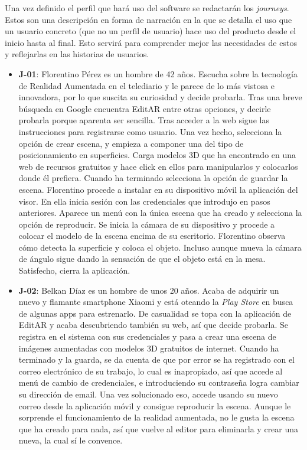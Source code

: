 Una vez definido el perfil que hará uso del software se redactarán los \textit{journeys}. Estos son una descripción en forma de narración en la que se detalla el uso que un usuario concreto (que no un perfil de usuario) hace uso del producto desde el inicio hasta al final. Esto servirá para comprender mejor las necesidades de estos y reflejarlas en las historias de usuarios.

\begin{itemize}
    \item \textbf{J-01}: Florentino Pérez es un hombre de 42 años. Escucha sobre la tecnología de Realidad Aumentada en el telediario y le parece de lo más vistosa e innovadora, por lo que suscita su curiosidad y decide probarla. Tras una breve búsqueda en Google encuentra EditAR entre otras opciones, y decirle probarla porque aparenta ser sencilla. Tras acceder a la web sigue las instrucciones para registrarse como usuario. Una vez hecho, selecciona la opción de crear escena, y empieza a componer una del tipo de posicionamiento en superficies. Carga modelos 3D que ha encontrado en una web de recursos gratuitos y hace click en ellos para manipularlos y colocarlos donde él prefiera. Cuando ha terminado selecciona la opción de guardar la escena. Florentino procede a instalar en su dispositivo móvil la aplicación del visor. En ella inicia sesión con las credenciales que introdujo en pasos anteriores. Aparece un menú con la única escena que ha creado y selecciona la opción de reproducir. Se inicia la cámara de su dispositivo y procede a colocar el modelo de la escena encima de su escritorio. Florentino observa cómo detecta la superficie y coloca el objeto. Incluso aunque mueva la cámara de ángulo sigue dando la sensación de que el objeto está en la mesa. Satisfecho, cierra la aplicación.
    
    \item \textbf{J-02}: Belkan Díaz es un hombre de unos 20 años. Acaba de adquirir un nuevo y flamante smartphone Xiaomi y está oteando la \textit{Play Store} en busca de algunas apps para estrenarlo. De casualidad se topa con la aplicación de EditAR y acaba descubriendo también su web, así que decide probarla. Se registra en el sistema con sus credenciales y pasa a crear una escena de imágenes aumentadas con modelos 3D gratuitos de internet. Cuando ha terminado y la guarda, se da cuenta de que por error se ha registrado con el correo electrónico de su trabajo, lo cual es inapropiado, así que accede al menú de cambio de credenciales, e introduciendo su contraseña logra cambiar su dirección de email. Una vez solucionado eso, accede usando su nuevo correo desde la aplicación móvil y consigue reproducir la escena. Aunque le sorprende el funcionamiento de la realidad aumentada, no le gusta la escena que ha creado para nada, así que vuelve al editor para eliminarla y crear una nueva, la cual sí le convence.


\end{itemize}
